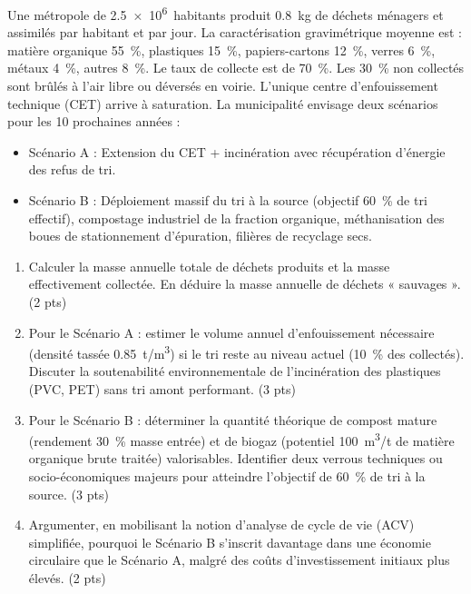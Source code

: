 \documentclass[11pt]{article}
\begin{document}
\begin{exercice}
Une métropole de \SI{2,5e6}{habitants} produit \SI{0,8}{kg} de déchets ménagers et assimilés par habitant et par jour. La caractérisation gravimétrique moyenne est : matière organique \SI{55}{\%}, plastiques \SI{15}{\%}, papiers-cartons \SI{12}{\%}, verres \SI{6}{\%}, métaux \SI{4}{\%}, autres \SI{8}{\%}. Le taux de collecte est de \SI{70}{\%}. Les \SI{30}{\%} non collectés sont brûlés à l'air libre ou déversés en voirie. L'unique centre d'enfouissement technique (CET) arrive à saturation. La municipalité envisage deux scénarios pour les 10 prochaines années :
\begin{itemize}
    \item Scénario A : Extension du CET + incinération avec récupération d'énergie des refus de tri.
    \item Scénario B : Déploiement massif du tri à la source (objectif \SI{60}{\%} de tri effectif), compostage industriel de la fraction organique, méthanisation des boues de stationnement d'épuration, filières de recyclage secs.
\end{itemize}
\begin{enumerate}
    \item Calculer la masse annuelle totale de déchets produits et la masse effectivement collectée. En déduire la masse annuelle de déchets « sauvages ». (2 pts)
    \item Pour le Scénario A : estimer le volume annuel d'enfouissement nécessaire (densité tassée \SI{0,85}{t/m^3}) si le tri reste au niveau actuel (\SI{10}{\%} des collectés). Discuter la soutenabilité environnementale de l'incinération des plastiques (PVC, PET) sans tri amont performant. (3 pts)
    \item Pour le Scénario B : déterminer la quantité théorique de compost mature (rendement \SI{30}{\%} masse entrée) et de biogaz (potentiel \SI{100}{m^3/t} de matière organique brute traitée) valorisables. Identifier deux verrous techniques ou socio-économiques majeurs pour atteindre l'objectif de \SI{60}{\%} de tri à la source. (3 pts)
    \item Argumenter, en mobilisant la notion d'analyse de cycle de vie (ACV) simplifiée, pourquoi le Scénario B s'inscrit davantage dans une économie circulaire que le Scénario A, malgré des coûts d'investissement initiaux plus élevés. (2 pts)
\end{enumerate}
\end{exercice}
\end{document}
